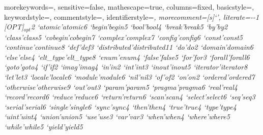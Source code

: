   {
    morekeywords={},
    sensitive=false,
    mathescape=true,
    columns=fixed,
    basicstyle=\footnotesize,
    keywordstyle=\footnotesize,
    commentstyle=\footnotesize\ttfamily,
    identifierstyle=\footnotesize\itshape,
    morecomment=[s]{`}{'},
    literate={-}{{\ttfamily -}}{1}
             {[OPT]}{{{\scriptsize $_{opt}$}}}{2}
             {`atomic'}{{\ttfamily atomic}}{6}
             {`begin'}{{\ttfamily begin}}{5}
             {`bool'}{{\ttfamily bool}}{4}
             {`break'}{{\ttfamily break}}{5}
             {`by'}{{\ttfamily by}}{2}
             {`class'}{{\ttfamily class}}{5}
             {`cobegin'}{{\ttfamily cobegin}}{7}
             {`complex'}{{\ttfamily complex}}{7}
             {`config'}{{\ttfamily config}}{6}
             {`const'}{{\ttfamily const}}{5}
             {`continue'}{{\ttfamily continue}}{8}
             {`def'}{{\ttfamily def}}{3}
             {`distributed'}{{\ttfamily distributed}}{11}
             {`do'}{{\ttfamily do}}{2}
             {`domain'}{{\ttfamily domain}}{6}
             {`else'}{{\ttfamily else}}{4}
             {`elt_type'}{{\ttfamily elt\_type}}{8}
             {`enum'}{{\ttfamily enum}}{4}
             {`false'}{{\ttfamily false}}{5}
             {`for'}{{\ttfamily for}}{3}
             {`forall'}{{\ttfamily forall}}{6}
             {`goto'}{{\ttfamily goto}}{4}
             {`if'}{{\ttfamily if}}{2}
             {`imag'}{{\ttfamily imag}}{4}
             {`in'}{{\ttfamily in}}{2}
             {`int'}{{\ttfamily int}}{3}
             {`inout'}{{\ttfamily inout}}{5}
             {`iterator'}{{\ttfamily iterator}}{8}
             {`let'}{{\ttfamily let}}{3}
             {`locale'}{{\ttfamily locale}}{6}
             {`module'}{{\ttfamily module}}{6}
             {`nil'}{{\ttfamily nil}}{3}
             {`of'}{{\ttfamily of}}{2}
             {`on'}{{\ttfamily on}}{2}
             {`ordered'}{{\ttfamily ordered}}{7}
             {`otherwise'}{{\ttfamily otherwise}}{9}
             {`out'}{{\ttfamily out}}{3}
             {`param'}{{\ttfamily param}}{5}
             {`pragma'}{{\ttfamily pragma}}{6}
             {`real'}{{\ttfamily real}}{4}
             {`record'}{{\ttfamily record}}{6}
             {`reduce'}{{\ttfamily reduce}}{6}
             {`return'}{{\ttfamily return}}{6}
             {`scan'}{{\ttfamily scan}}{4}
             {`select'}{{\ttfamily select}}{6}
             {`seq'}{{\ttfamily seq}}{3}
             {`serial'}{{\ttfamily serial}}{6}
             {`single'}{{\ttfamily single}}{6}
             {`sync'}{{\ttfamily sync}}{4}
             {`then'}{{\ttfamily then}}{4}
             {`true'}{{\ttfamily true}}{4}
             {`type'}{{\ttfamily type}}{4}
             {`uint'}{{\ttfamily uint}}{4}
             {`union'}{{\ttfamily union}}{5}
             {`use'}{{\ttfamily use}}{3}
             {`var'}{{\ttfamily var}}{3}
             {`when'}{{\ttfamily when}}{4}
             {`where'}{{\ttfamily where}}{5}
             {`while'}{{\ttfamily while}}{5}
             {`yield'}{{\ttfamily yield}}{5}
  }


\newcommand{\sntx}[1]{\lstinline[language=syntax]!#1!}
